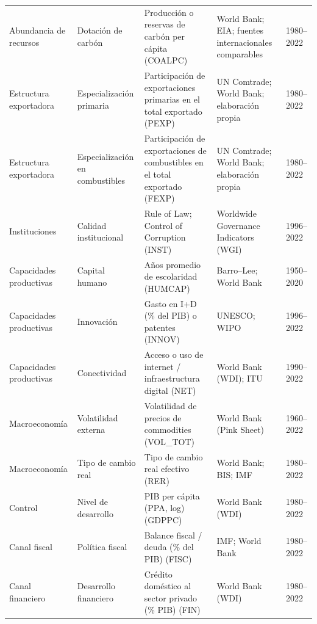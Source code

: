 \documentclass[../../PTFM.tex]{subfiles}
\begin{document}
\begin{footnotesize}
\begin{longtable}{
				L{2.35cm}
				L{2.5cm}
				L{3.8cm}
				L{3.25cm}
				L{1.6cm}
			}
			Abundancia de recursos
			& Dotación de carbón
			& Producción o reservas de carbón per cápita (COALPC)
			& World Bank; EIA; fuentes internacionales comparables
			& 1980--2022 \\

			Estructura exportadora
			& Especialización primaria
			& Participación de exportaciones primarias en el total exportado (PEXP)
			& UN Comtrade; World Bank; elaboración propia
			& 1980--2022 \\

			Estructura exportadora
			& Especialización en combustibles
			& Participación de exportaciones de combustibles en el total exportado (FEXP)
			& UN Comtrade; World Bank; elaboración propia
			& 1980--2022 \\

			Instituciones
			& Calidad institucional
			& Rule of Law; Control of Corruption (INST)
			& Worldwide Governance Indicators (WGI)
			& 1996--2022 \\

			Capacidades productivas
			& Capital humano
			& Años promedio de escolaridad (HUMCAP)
			& Barro--Lee; World Bank
			& 1950--2020 \\

			Capacidades productivas
			& Innovación
			& Gasto en I+D (\% del PIB) o patentes (INNOV)
			& UNESCO; WIPO
			& 1996--2022 \\

			Capacidades productivas
			& Conectividad
			& Acceso o uso de internet / infraestructura digital (NET)
			& World Bank (WDI); ITU
			& 1990--2022 \\

			Macroeconomía
			& Volatilidad externa
			& Volatilidad de precios de commodities (VOL\_TOT)
			& World Bank (Pink Sheet)
			& 1960--2022 \\

			Macroeconomía
			& Tipo de cambio real
			& Tipo de cambio real efectivo (RER)
			& World Bank; BIS; IMF
			& 1980--2022 \\

			Control
			& Nivel de desarrollo
			& PIB per cápita (PPA, log) (GDPPC)
			& World Bank (WDI)
			& 1980--2022 \\

			Canal fiscal
			& Política fiscal
			& Balance fiscal / deuda (\% del PIB) (FISC)
			& IMF; World Bank
			& 1980--2022 \\

			Canal financiero
			& Desarrollo financiero
			& Crédito doméstico al sector privado (\% PIB) (FIN)
			& World Bank (WDI)
			& 1980--2022 \\


\end{longtable}
\end{footnotesize}
\end{document}

